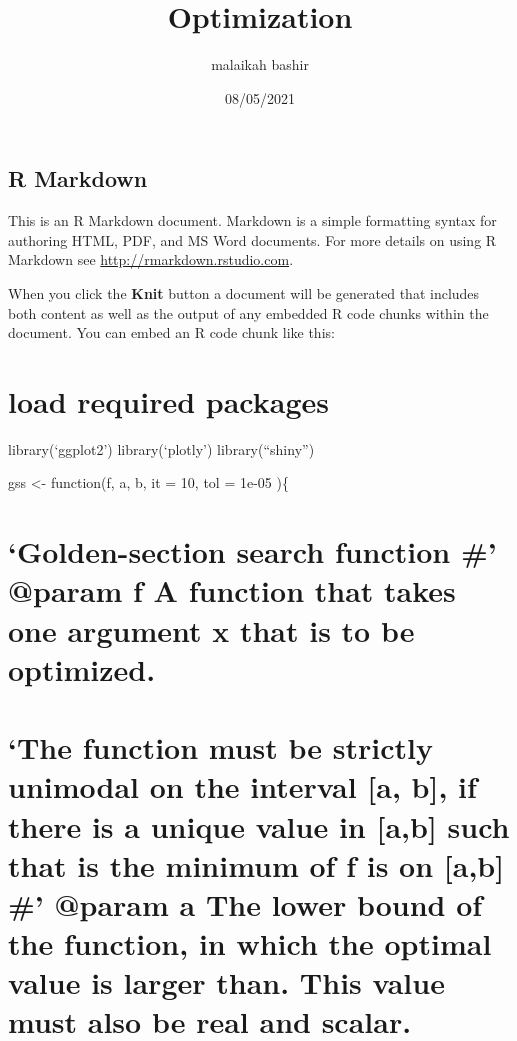 \documentclass[]{article}
\title{Optimization}
\author{malaikah bashir}
\date{08/05/2021}
\begin{document}
\maketitle

\subsection{R Markdown}\label{r-markdown}

This is an R Markdown document. Markdown is a simple formatting syntax
for authoring HTML, PDF, and MS Word documents. For more details on
using R Markdown see \url{http://rmarkdown.rstudio.com}.

When you click the \textbf{Knit} button a document will be generated
that includes both content as well as the output of any embedded R code
chunks within the document. You can embed an R code chunk like this:

\section{load required packages}\label{load-required-packages}

library(`ggplot2') library(`plotly') library(``shiny'')

gss \textless{}- function(f, a, b, it = 10, tol = 1e-05 )\{

\section{\texorpdfstring{`Golden-section search function \#' @param f A
function that takes one argument x that is to be
optimized.}{Golden-section search function \# @param f A function that takes one argument x that is to be optimized.}}\label{golden-section-search-function-param-f-a-function-that-takes-one-argument-x-that-is-to-be-optimized.}

\section{\texorpdfstring{`The function must be strictly unimodal on the
interval {[}a, b{]}, if there is a unique value in {[}a,b{]} such that
is the minimum of f is on {[}a,b{]} \#' @param a The lower bound of the
function, in which the optimal value is larger than. This value must
also be real and
scalar.}{The function must be strictly unimodal on the interval {[}a, b{]}, if there is a unique value in {[}a,b{]} such that is the minimum of f is on {[}a,b{]} \# @param a The lower bound of the function, in which the optimal value is larger than. This value must also be real and scalar.}}\label{the-function-must-be-strictly-unimodal-on-the-interval-a-b-if-there-is-a-unique-value-in-ab-such-that-is-the-minimum-of-f-is-on-ab-param-a-the-lower-bound-of-the-function-in-which-the-optimal-value-is-larger-than.-this-value-must-also-be-real-and-scalar.}
\end{document}
